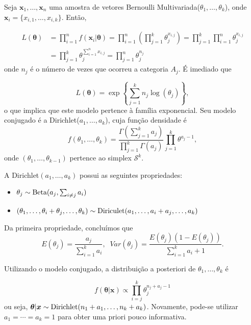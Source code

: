 \documentclass[
  letterpaper,
  DIV=11,
  numbers=noendperiod]{scrreprt}
\providecommand{\tightlist}{%
  \setlength{\itemsep}{0pt}\setlength{\parskip}{0pt}}\usepackage{longtable,booktabs,array}
\theoremstyle{plain}
\theoremstyle{definition}
\theoremstyle{definition}
\theoremstyle{remark}
\begin{document}
Seja \(\boldsymbol{x}_1,\ldots,\boldsymbol{x}_n\) uma amostra de vetores
Bernoulli Multivariada(\(\theta_1,\ldots,\theta_k\)), onde
\(\boldsymbol{x}_i=\{x_{i,1},\ldots,x_{i,k}\}\). Então,

\[\begin{align}L(\boldsymbol{\theta})&=\prod_{i=1}^nf(\boldsymbol{x}_i|\boldsymbol{\theta})=\prod_{i=1}^n\left(\prod_{j=1}^k \theta_j^{x_{i,j}}\right)=\prod_{j=1}^k \prod_{i=1}^n\theta_j^{x_{i,j}}\\&=\prod_{j=1}^k \theta_j^{\sum_{i=1}^nx_{i,j}}=\prod_{j=1}^n\theta_j^{n_j}\end{align}\]
onde \(n_j\) é o número de vezes que ocorreu a categoria \(A_j\). É
imediado que

\[L(\boldsymbol{\theta})=\exp\left\{\sum_{j=1}^k n_j\log(\theta_j)\right\},\]
o que implica que este modelo pertence à família exponencial. Seu modelo
conjugado é a Dirichlet(\(a_1,\ldots,a_k\)), cuja função densidade é
\[f(\theta_1,\ldots,\theta_k)=\frac{\Gamma\left(\sum_{j=1}^k a_j\right)}{\prod_{j=1}^k \Gamma(a_j)}\prod_{j=1}^k \theta^{a_j-1},\]
onde \((\theta_1,\ldots,\theta_{k-1})\) pertence ao simplex
\(\mathcal{S}^k\).

A Dirichlet\((a_1,\ldots,a_k)\) possui as seguintes propriedades:

\begin{itemize}
\tightlist
\item
  \(\theta_j\sim\hbox{Beta}(a_j,\sum_{i\neq j}a_i)\)
\item
  \((\theta_1,\ldots,\theta_i+\theta_j,\ldots,\theta_k)\sim\hbox{Diriculet}(a_1,\ldots,a_i+a_j,\ldots,a_k)\)
\end{itemize}

Da primeira propriedade, concluímos que
\[E(\theta_j)=\frac{a_j}{\sum_{i=1}^k a_i},\;\;Var(\theta_j)=\frac{E(\theta_j)(1-E(\theta_j))}{\sum_{i=1}^k a_i+1}.\]

Utilizando o modelo conjugado, a distribuição a posteriori de
\(\theta_1,\ldots,\theta_k\) é

\[f(\boldsymbol{\theta}|\boldsymbol{x})\propto \prod_{i=j}^k \theta_j^{n_j+a_j-1}\]
ou seja,
\(\boldsymbol{\theta}|\boldsymbol{x}\sim\hbox{Dirichlet}(n_1+a_1,\ldots,n_k+a_k)\).
Novamente, pode-se utilizar \(a_1=\cdots=a_k=1\) para obter uma priori
pouco informativa.
\end{document}
